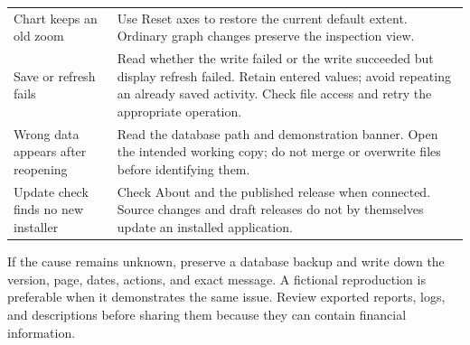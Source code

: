 \begin{longtable}{@{}>{\raggedright\arraybackslash}p{}p{}@{}}
Chart keeps an old zoom & Use Reset axes to restore the current default extent. Ordinary graph changes preserve the inspection view.\\
Save or refresh fails & Read whether the write failed or the write succeeded but display refresh failed. Retain entered values; avoid repeating an already saved activity. Check file access and retry the appropriate operation.\\
Wrong data appears after reopening & Read the database path and demonstration banner. Open the intended working copy; do not merge or overwrite files before identifying them.\\
Update check finds no new installer & Check About and the published release when connected. Source changes and draft releases do not by themselves update an installed application.\\
\bottomrule
\end{longtable}

If the cause remains unknown, preserve a database backup and write down the version, page, dates, actions, and exact message. A fictional reproduction is preferable when it demonstrates the same issue. Review exported reports, logs, and descriptions before sharing them because they can contain financial information.
